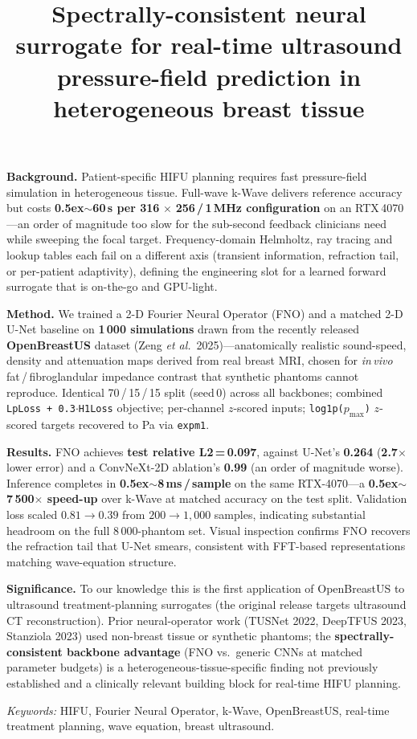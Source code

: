 \documentclass[11pt,a4paper]{article}
\begin{document}
\title{Spectrally-consistent neural surrogate for real-time ultrasound
       pressure-field prediction in heterogeneous breast tissue}
\date{}
\maketitle

\noindent
\textbf{Background.}
Patient-specific HIFU planning requires fast pressure-field simulation in
heterogeneous tissue.
Full-wave k-Wave delivers reference accuracy but costs
\textbf{{\raise0.5ex\hbox{$\sim$}}60\,s per 316$\,\times\,$256\,/\,1\,MHz
configuration} on an RTX\,4070---an order of magnitude too slow for the
sub-second feedback clinicians need while sweeping the focal target.
Frequency-domain Helmholtz, ray tracing and lookup tables each fail on a
different axis (transient information, refraction tail, or per-patient
adaptivity), defining the engineering slot for a learned forward surrogate that
is on-the-go and GPU-light.

\noindent
\textbf{Method.}
We trained a 2-D Fourier Neural Operator (FNO) and a matched 2-D U-Net
baseline on \textbf{1\,000 simulations} drawn from the recently released
\textbf{OpenBreastUS} dataset (Zeng \textit{et al.}\ 2025)---anatomically
realistic sound-speed, density and attenuation maps derived from real breast
MRI, chosen for \textit{in\,vivo} fat\,/\,fibroglandular impedance contrast that
synthetic phantoms cannot reproduce.
Identical 70\,/\,15\,/\,15 split (seed\,0) across all backbones; combined
\texttt{LpLoss\,+\,0.3$\cdot$H1Loss} objective; per-channel $z$-scored inputs;
\texttt{log1p(}$p_{\max}$\texttt{)} $z$-scored targets recovered to Pa via
\texttt{expm1}.

\noindent
\textbf{Results.}
FNO achieves \textbf{test relative L2\,=\,0.097}, against U-Net's
\textbf{0.264} (\textbf{2.7$\times$} lower error) and a ConvNeXt-2D
ablation's \textbf{0.99} (an order of magnitude worse).
Inference completes in \textbf{{\raise0.5ex\hbox{$\sim$}}8\,ms\,/\,sample}
on the same RTX-4070---a \textbf{{\raise0.5ex\hbox{$\sim$}}7\,500$\times$
speed-up} over k-Wave at matched accuracy on the test split.
Validation loss scaled $0.81\to0.39$ from $200\to1{,}000$ samples, indicating
substantial headroom on the full 8\,000-phantom set.
Visual inspection confirms FNO recovers the refraction tail that U-Net smears,
consistent with FFT-based representations matching wave-equation structure.

\noindent
\textbf{Significance.}
To our knowledge this is the first application of OpenBreastUS to ultrasound
treatment-planning surrogates (the original release targets ultrasound CT
reconstruction).
Prior neural-operator work (TUSNet 2022, DeepTFUS 2023, Stanziola 2023) used
non-breast tissue or synthetic phantoms; the \textbf{spectrally-consistent
backbone advantage} (FNO vs.\ generic CNNs at matched parameter budgets) is a
heterogeneous-tissue-specific finding not previously established and a
clinically relevant building block for real-time HIFU planning.

\smallskip\noindent
\textit{Keywords:} HIFU, Fourier Neural Operator, k-Wave, OpenBreastUS,
real-time treatment planning, wave equation, breast ultrasound.
\end{document}
